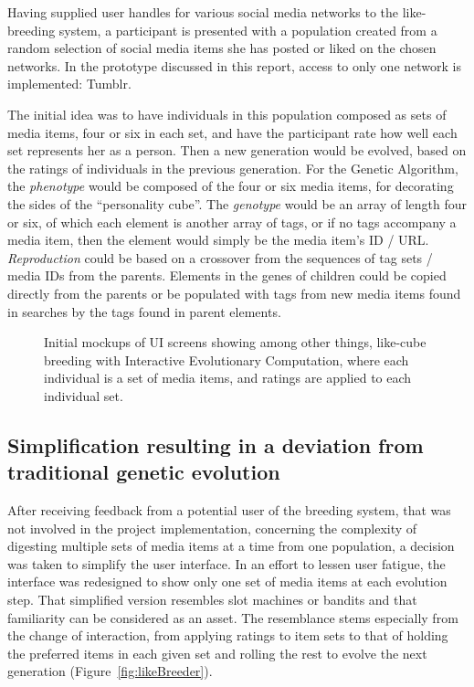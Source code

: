 \documentclass[]{article}
\begin{document}
Having supplied user handles for various social media networks to the like-breeding system, a participant is presented with a population created from a random selection of social media items she has posted or liked on the chosen networks.  In the prototype discussed in this report, access to only one network is implemented:  Tumblr.

The initial idea was to have individuals in this population composed as sets of media items, four or six in each set, and have the participant rate how well each set represents her as a person.  Then a new generation would be evolved, based on the ratings of individuals in the previous generation.  For the Genetic Algorithm, the \textit{phenotype} would be composed of the four or six media items, for decorating the sides of the “personality cube”.  
The \textit{genotype} would be an array of length four or six, of which each element is another array of tags, or if no tags accompany a media item, then the element would simply be the media item's ID / URL.
\textit{Reproduction} could be based on a crossover from the sequences of tag sets / media IDs from the parents.  
Elements in the genes of children could be copied directly from the parents or be populated with tags from new media items found in searches by the tags found in parent elements.

\begin{figure}[htp]
	\caption{Initial mockups of UI screens showing among other things, like-cube breeding with Interactive Evolutionary Computation, where each individual is a set of media items, and ratings are applied to each individual set.}
	\label{fig:breedingMockup}
\end{figure}


\subsection{Simplification resulting in a deviation from traditional genetic evolution}

After receiving feedback from a potential user of the breeding system, that was not involved in the project implementation, concerning the complexity of digesting multiple sets of media items at a time from one population, a decision was taken to simplify the user interface.  In an effort to lessen user fatigue, the interface was redesigned to show only one set of media items at each evolution step.  That simplified version resembles slot machines or bandits and that familiarity can be considered as an asset.  The resemblance stems especially from the change of interaction, from applying ratings to item sets to that of holding the preferred items in each given set and rolling the rest to evolve the next generation (Figure~\ref{fig:likeBreeder}).
\end{document}
